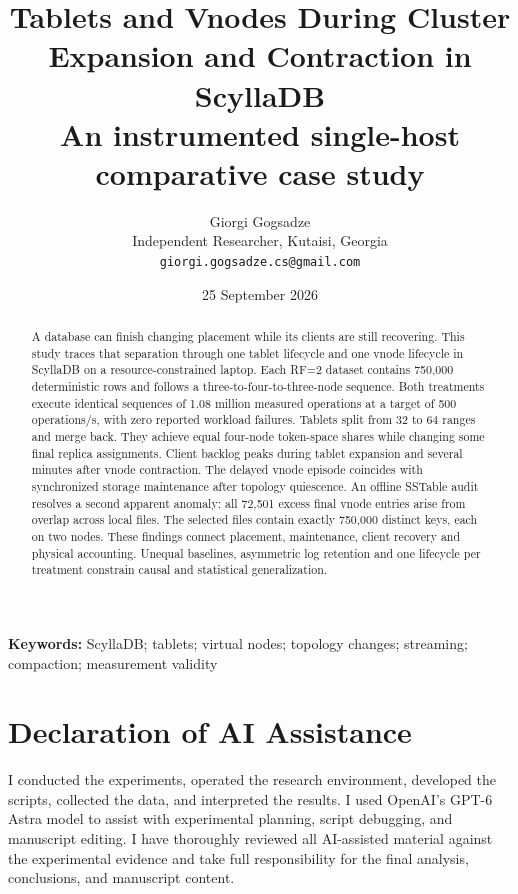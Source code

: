 \documentclass[10pt,a4paper]{article}
\title{Tablets and Vnodes During Cluster Expansion and Contraction in ScyllaDB\\[5pt]\large An instrumented single-host comparative case study}
\author{Giorgi Gogsadze\\\small Independent Researcher, Kutaisi, Georgia\\\small \texttt{giorgi.gogsadze.cs@gmail.com}}
\date{25 September 2026}
\begin{document}
\maketitle
\begin{abstract}
A database can finish changing placement while its clients are still recovering. This study traces that separation through one tablet lifecycle and one vnode lifecycle in ScyllaDB on a resource-constrained laptop. Each RF=2 dataset contains 750,000 deterministic rows and follows a three-to-four-to-three-node sequence. Both treatments execute identical sequences of 1.08 million measured operations at a target of 500 operations/s, with zero reported workload failures. Tablets split from 32 to 64 ranges and merge back. They achieve equal four-node token-space shares while changing some final replica assignments. Client backlog peaks during tablet expansion and several minutes after vnode contraction. The delayed vnode episode coincides with synchronized storage maintenance after topology quiescence. An offline SSTable audit resolves a second apparent anomaly: all 72,501 excess final vnode entries arise from overlap across local files. The selected files contain exactly 750,000 distinct keys, each on two nodes. These findings connect placement, maintenance, client recovery and physical accounting. Unequal baselines, asymmetric log retention and one lifecycle per treatment constrain causal and statistical generalization.
\end{abstract}
\textbf{Keywords:} ScyllaDB; tablets; virtual nodes; topology changes; streaming; compaction; measurement validity

\section*{Declaration of AI Assistance}

I conducted the experiments, operated the research environment, developed the scripts, collected the data, and interpreted the results. I used OpenAI's GPT-6 Astra model to assist with experimental planning, script debugging, and manuscript editing. I have thoroughly reviewed all AI-assisted material against the experimental evidence and take full responsibility for the final analysis, conclusions, and manuscript content.

\newpage

\newpage


\end{document}
